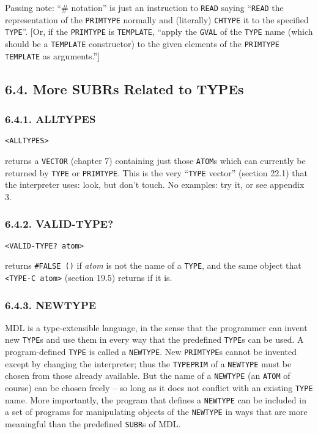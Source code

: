 \documentclass[a4paper,]{article}
\begin{document}
Passing note: ``\# notation'' \index{\texttt{\#}} is just an instruction to \texttt{READ} saying ``\texttt{READ} the
representation of the \texttt{PRIMTYPE} normally and (literally) \texttt{CHTYPE} it to the specified \texttt{TYPE}''.
{[}Or, if the \texttt{PRIMTYPE} is \texttt{TEMPLATE}, ``apply the \texttt{GVAL} of the \texttt{TYPE} name (which should be
a \texttt{TEMPLATE} constructor) to the given elements of the \texttt{PRIMTYPE} \texttt{TEMPLATE} as arguments.''{]}

\subsection{6.4. More SUBRs Related to TYPEs}\label{more-subrs-related-to-types}

\subsubsection{6.4.1. ALLTYPES}\label{alltypes}

\begin{verbatim}
<ALLTYPES>
\end{verbatim}

 returns a \texttt{VECTOR} (chapter 7) containing just those \texttt{ATOM}s which can
currently be returned by \texttt{TYPE} or \texttt{PRIMTYPE}. This is the very ``\texttt{TYPE} vector'' (section 22.1) that
the interpreter uses: look, but don't touch. No examples: try it, or see appendix 3.

\subsubsection{6.4.2. VALID-TYPE?}\label{valid-type}

\begin{verbatim}
<VALID-TYPE? atom>
\end{verbatim}

 returns \texttt{\#FALSE\ ()} if \emph{atom} is not the name of a \texttt{TYPE}, and the
same object that \texttt{\textless{}TYPE-C\ atom\textgreater{}} (section 19.5) returns if it is.

\subsubsection{6.4.3. NEWTYPE}\label{newtype}

MDL is a type-extensible language, in the sense that the programmer can invent new \texttt{TYPE}s and use them in every way
that the predefined \texttt{TYPE}s can be used. A program-defined \texttt{TYPE} is called a
\texttt{NEWTYPE}. New \texttt{PRIMTYPE}s cannot be invented except by changing the
interpreter; thus the \texttt{TYPEPRIM} of a \texttt{NEWTYPE} must be chosen from those already available. But the name of
a \texttt{NEWTYPE} (an \texttt{ATOM} of course) can be chosen freely -- so long as it does not conflict with an existing
\texttt{TYPE} name. More importantly, the program that defines a \texttt{NEWTYPE} can be included in a set of programs for
manipulating objects of the \texttt{NEWTYPE} in ways that are more meaningful than the predefined \texttt{SUBR}s of MDL.
\end{document}
